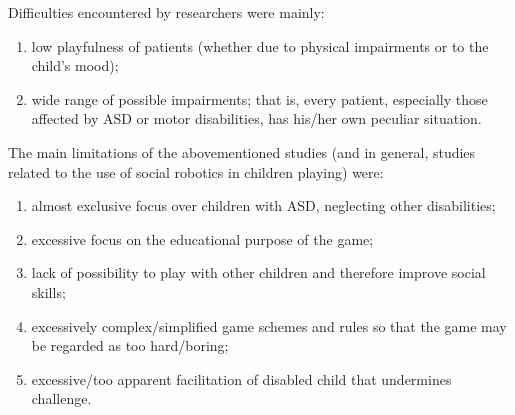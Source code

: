 \documentclass[a4paper,twoside]{book}
\begin{document}
\beforelist Difficulties encountered by researchers were mainly:
\begin{enumerate}
\item low playfulness of patients (whether due to physical impairments or to the child's mood);
\item wide range of possible impairments; that is, every patient, especially those affected by ASD or motor disabilities, has his/her own peculiar situation.
\end{enumerate}
\afterlist*
\beforelist* The main limitations of the above\textendash mentioned studies (and in general, studies related to the use of social robotics in children playing) were:
\begin{enumerate}
\item almost exclusive focus over children with ASD, neglecting other disabilities;
\item excessive focus on the educational purpose of the game;
\item lack of possibility to play with other children and therefore improve social skills;
\item excessively complex/simplified game schemes and rules so that the game may be regarded as too hard/boring;
\item excessive/too apparent facilitation of disabled child that undermines challenge.
\end{enumerate}
\afterlist*
\end{document}
